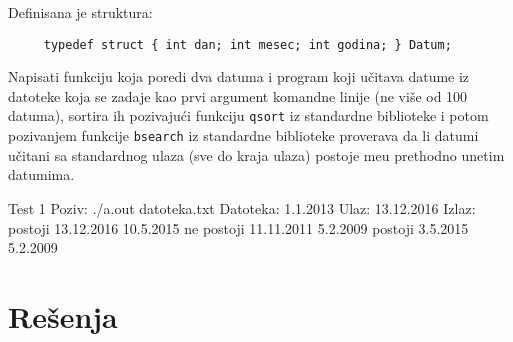 \begin{Exercise}[label=516]
Definisana je struktura:
\begin{verbatim}
     typedef struct { int dan; int mesec; int godina; } Datum;
\end{verbatim}

Napisati funkciju koja poredi dva datuma i program koji u\v{c}itava
datume iz datoteke koja se zadaje kao prvi argument komandne linije
(ne vi\v{s}e od 100 datuma), sortira ih pozivaju\'ci funkciju
\verb|qsort| iz standardne biblioteke i potom pozivanjem funkcije
\verb|bsearch| iz standardne biblioteke proverava da li datumi u\v
citani sa standardnog ulaza (sve do kraja ulaza) postoje me\dj u
prethodno unetim datumima.
  
  \begin{maxitest}
    \begin{test}{Test 1}
Poziv: ./a.out datoteka.txt
Datoteka:  1.1.2013       Ulaz:  13.12.2016     Izlaz:  postoji
           13.12.2016            10.5.2015              ne postoji
           11.11.2011            5.2.2009               postoji
           3.5.2015
           5.2.2009
    \end{test}
  \end{maxitest}
  
\end{Exercise}




\section{Rešenja}
\shipoutAnswer


